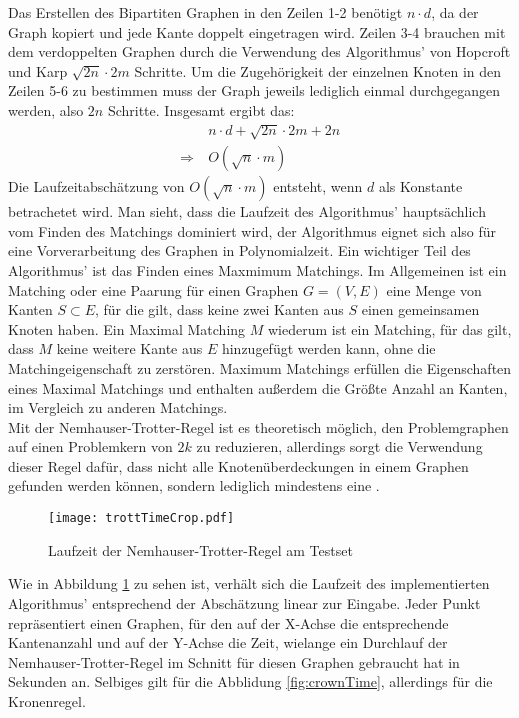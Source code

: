 Das Erstellen des Bipartiten Graphen in den Zeilen 1-2 benötigt $n \cdot d$, da der Graph kopiert und jede Kante doppelt eingetragen wird. Zeilen 3-4 brauchen mit dem verdoppelten Graphen durch die Verwendung des Algorithmus' von Hopcroft und Karp $\sqrt{2n} \cdot 2m$ Schritte. Um die Zugehörigkeit der einzelnen Knoten in den Zeilen 5-6 zu bestimmen muss der Graph jeweils lediglich einmal durchgegangen werden, also $2n$ Schritte. Insgesamt ergibt das:
\begin{align}
&\ n \cdot d + \sqrt{2n} \cdot 2m + 2n\\
\Rightarrow &\ O(\sqrt{n} \cdot m)
\end{align}
Die Laufzeitabschätzung von  $O(\sqrt{n} \cdot m)$ entsteht, wenn $d$ als Konstante betrachetet wird. Man sieht, dass die Laufzeit des Algorithmus' hauptsächlich vom Finden des Matchings dominiert wird, der Algorithmus eignet sich also für eine Vorverarbeitung des Graphen in Polynomialzeit.
Ein wichtiger Teil des Algorithmus' ist das Finden eines Maxmimum Matchings. Im Allgemeinen ist ein Matching oder eine Paarung für einen Graphen $G=(V,E)$ eine Menge von Kanten $S \subset E$, für die gilt, dass keine zwei Kanten aus $S$ einen gemeinsamen Knoten haben. Ein Maximal Matching $M$ wiederum ist ein Matching, für das gilt, dass $M$ keine weitere Kante aus $E$ hinzugefügt werden kann, ohne die Matchingeigenschaft zu zerstören. Maximum Matchings erfüllen die Eigenschaften eines Maximal Matchings und enthalten außerdem die Größte Anzahl an Kanten, im Vergleich zu anderen Matchings.\\
Mit der Nemhauser-Trotter-Regel ist es theoretisch möglich, den Problemgraphen auf einen Problemkern von $2k$ zu reduzieren, allerdings sorgt die Verwendung dieser Regel dafür, dass nicht alle Knotenüberdeckungen in einem Graphen gefunden werden können, sondern lediglich mindestens eine \cite{fixed}.
\begin{figure}[htb]
\centering
  	{\texttt{[image: trottTimeCrop.pdf]}}
	\caption{Laufzeit der Nemhauser-Trotter-Regel am Testset\label{fig:trottTime}}
\centering
\end{figure}Wie in Abbildung \ref{fig:trottTime} zu sehen ist, verhält sich die Laufzeit des implementierten Algorithmus' entsprechend der Abschätzung linear zur Eingabe. Jeder Punkt repräsentiert einen Graphen, für den auf der X-Achse die entsprechende Kantenanzahl und auf der Y-Achse die Zeit, wielange ein Durchlauf der Nemhauser-Trotter-Regel im Schnitt für diesen Graphen gebraucht hat in Sekunden an. Selbiges gilt für die Abblidung \ref{fig:crownTime}, allerdings für die Kronenregel.
